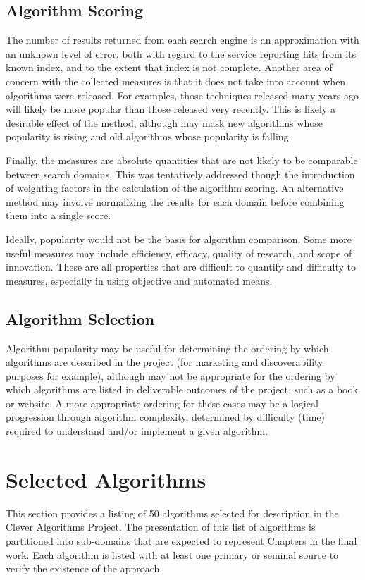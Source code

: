 \documentclass[a4paper, 11pt]{article}
\begin{document}
\subsection{Algorithm Scoring}
The number of results returned from each search engine is an approximation with an unknown level of error, both with regard to the service reporting hits from its known index, and to the extent that index is not complete. Another area of concern with the collected measures is that it does not take into account when algorithms were released. For examples, those techniques released many years ago will likely be more popular than those released very recently. This is likely a desirable effect of the method, although may mask new algorithms whose popularity is rising and old algorithms whose popularity is falling. 

Finally, the measures are absolute quantities that are not likely to be comparable between search domains. This was tentatively addressed though the introduction of weighting factors in the calculation of the algorithm scoring. An alternative method may involve normalizing the results for each domain before combining them into a single score.

Ideally, popularity would not be the basis for algorithm comparison. Some more useful measures may include efficiency, efficacy, quality of research, and scope of innovation. These are all properties that are difficult to quantify and difficulty to measures, especially in using objective and automated means.  

\subsection{Algorithm Selection}
Algorithm popularity may be useful for determining the ordering by which algorithms are described in the project (for marketing and discoverability purposes for example), although may not be appropriate for the ordering by which algorithms are listed in deliverable outcomes of the project, such as a book or website. A more appropriate ordering for these cases may be a logical progression through algorithm complexity, determined by difficulty (time) required to understand and/or implement a given algorithm.  

% 
% 
\section{Selected Algorithms}
\label{sec:selection}
This section provides a listing of 50 algorithms selected for description in the Clever Algorithms Project. The presentation of this list of algorithms is partitioned into sub-domains that are expected to represent Chapters in the final work. Each algorithm is listed with at least one primary or seminal source to verify the existence of the approach.
\end{document}
